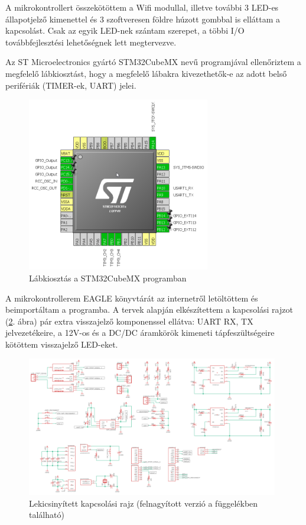 \documentclass[../main.tex]{subfiles}
\begin{document}
            A mikrokontrollert összekötöttem a Wifi modullal, illetve további 3 LED-es állapotjelző kimenettel és 3 szoftveresen földre húzott gombbal is elláttam a kapcsolást. Csak az egyik LED-nek szántam szerepet, a többi I/O továbbfejlesztési lehetőségnek lett megtervezve.
            
            Az ST Microelectronics gyártó STM32CubeMX nevű programjával ellenőriztem a megfelelő lábkiosztást, hogy a megfelelő lábakra kivezethetők-e az adott belső perifériák (TIMER-ek, UART) jelei. 
            \begin{figure}[h!]
                \centering
                    \includegraphics[width=8cm]{resources/pcb_res/cubeMX_pinout.png}
                \caption{Lábkiosztás a STM32CubeMX programban}
                \label{fig:CubeMX_pinout}
            \end{figure}
            
            
            A mikrokontrollerem EAGLE könyvtárát az internetről letöltöttem és beimportáltam a programba. A tervek alapján elkészítettem a kapcsolási rajzot (\ref{fig:schematic_v02}. ábra) pár extra visszajelző komponenssel ellátva: UART RX, TX jelvezetékeire, a 12V-os és a DC/DC áramkörök kimeneti tápfeszültségeire kötöttem visszajelző LED-eket. 
            
            \begin{figure}[h!]
                \centering
                    \includegraphics[width=11cm]{resources/pcb_res/schematic_v02.png}
                \caption{Lekicsinyített kapcsolási rajz (felnagyított verzió a függelékben található)}
                \label{fig:schematic_v02}
            \end{figure}
            
\end{document}
